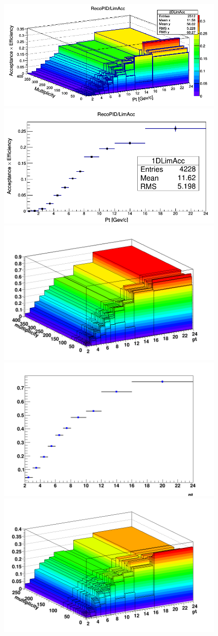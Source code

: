\begin{figure}[h]   %
	\centering
	\includegraphics[width=.48\linewidth]{figures/Effs/EfficiencyMap_2D_DPlus_b_Ref_wLimAcc_Plot.png}
	\includegraphics[width=.48\linewidth]{figures/Effs/EfficiencyMap_1D_DPlus_b_Ref_wLimAcc_Plot.png}
	\includegraphics[width=.48\linewidth]{figures/Effs/EfficiencyMap_2D_DStar_b_Ref_wLimAcc_Plot.png}
	\includegraphics[width=.48\linewidth]{figures/Effs/EfficiencyMap_1D_DStar_b_Ref_wLimAcc_Plot.png}
	\includegraphics[width=.48\linewidth]{figures/Effs/EfficiencyMap_2D_Dzero_b_Ref_wLimAcc_Plot.png}

\end{figure}
